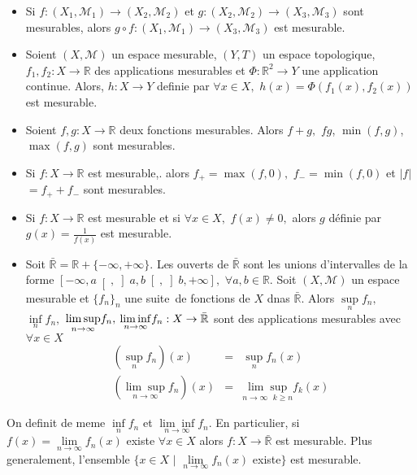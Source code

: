 \documentclass[3pt]{article}
\begin{document}
\begin{itemize}
\item Si $f:(X_{1},\mathcal{M}_{1})\rightarrow (X_{2},\mathcal{M}_{2})$ et $%
g:(X_{2},\mathcal{M}_{2})\rightarrow (X_{3},\mathcal{M}_{3})$ sont
mesurables, alors $g\circ f:(X_{1},\mathcal{M}_{1})\rightarrow (X_{3},%
\mathcal{M}_{3})$ est mesurable.

\item Soient $(X,\mathcal{M})$ un espace mesurable, $(Y,T)$ un espace
topologique, $f_{1},f_{2}:X\rightarrow \mathbb{R}$ des applications
mesurables et $\Phi :\mathbb{R}^{2}\rightarrow Y$ une application continue.
Alors, $h:X\rightarrow Y$ definie par $\forall x\in X,$ $h(x)=\Phi
(f_{1}(x),f_{2}(x))$ est mesurable.

\item Soient $f,g:X\rightarrow \mathbb{R}$ deux fonctions mesurables. Alors $%
f+g,$ $fg$, $\min (f,g)$, $\max (f,g)$ sont mesurables.

\item Si $f:X\rightarrow \mathbb{R}$ est mesurable,. alors $f_{+}=\max
(f,0), $ $f_{-}=\min (f,0)$ et $|f|$ $=f_{+}+f_{-}$ sont mesurables.

\item Si $f:X\rightarrow \mathbb{R}$ est mesurable et si $\forall x\in X,$ $%
f(x)\neq 0,$ alors $g$ d\'{e}finie par $g(x)=\frac{1}{f(x)}$ est mesurable.

\item Soit $\mathbb{\bar{R}}=\mathbb{R}+\{-\infty ,+\infty \}.$ Les ouverts
de $\mathbb{\bar{R}}$ sont les unions d'intervalles de la forme $\left[
-\infty ,a\right[ ,\left] a,b\right[ ,\left] b,+\infty \right] ,$ $\forall
a,b\in \mathbb{R}.$ Soit $(X,\mathcal{M})$ un espace mesurable et $%
\{f_{n}\}_{n}$ une suite\ de fonctions de $X$ dnas $\mathbb{\bar{R}}$. Alors 
$\underset{n}{\sup }f_{n},$ $\underset{n}{\inf }f_{n},$ $\underset{%
n\rightarrow \infty }{\lim \sup }f_{n},$ $\underset{n\rightarrow \infty }{%
\lim \inf }f_{n}:X\rightarrow \mathbb{\bar{R}}$ sont des applications
mesurables avec $\forall x\in X$%
\begin{eqnarray*}
\left( \underset{n}{\sup }f_{n}\right) (x) &=&\underset{n}{\sup }f_{n}(x) \\
\left( \underset{n\rightarrow \infty }{\lim \sup }f_{n}\right) (x) &=&%
\underset{n\rightarrow \infty \text{ }k\geq n}{\lim \sup }f_{k}(x)
\end{eqnarray*}
\end{itemize}

On definit de meme $\underset{n}{\inf }f_{n}$ et $\underset{n\rightarrow
\infty }{\lim \inf }f_{n}.$ En particulier, si $f(x)=\underset{n\rightarrow
\infty }{\lim }f_{n}(x)$ existe $\forall x\in X$ alors $f:X\rightarrow 
\mathbb{\bar{R}}$ est mesurable. Plus generalement, l'ensemble $\{x\in X$ $|$
$\underset{n\rightarrow \infty }{\lim }f_{n}(x)$ existe$\}$ est mesurable.
\end{document}
